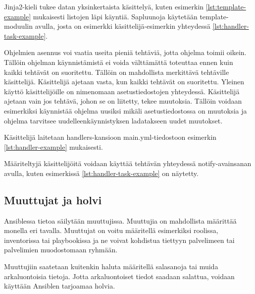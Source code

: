 

Jinja2-kieli tukee datan yksinkertaista käsittelyä, kuten esimerkin
\ref{lst:template-example} mukaisesti listojen läpi käyntiä. Sapluunoja
käytetään template-moduulin avulla, josta on esimerkki käsittelijä-esimerkin
yhteydessä \ref{lst:handler-task-example}. \parencite{AnsibleDocs}

Ohjelmien asennus voi vaatia useita pieniä tehtäviä, jotta ohjelma toimii
oikein. Tällöin ohjelman käynnistämistä ei voida välttämättä toteuttaa ennen
kuin kaikki tehtävät on suoritettu. Tällöin on mahdollista merkittävä tehtäville
käsittelijä. Käsittelijä ajetaan vasta, kun kaikki tehtävät on suoritettu.
Yleinen käyttö käsittelijöille  on nimenomaan asetustiedostojen yhteydessä.
Käsittelijä ajetaan vain jos tehtävä, johon se on liitetty, tekee muutoksia.
Tällöin voidaan esimerkiksi käynnistää ohjelma uusiksi mikäli asetustiedostossa
on muutoksia ja ohjelma tarvitsee uudelleenkäynnistyksen ladatakseen uudet
muutokset. \parencite{JamesFreeman2020PA2}

Käsittelijä laitetaan handlers-kansioon main.yml-tiedostoon esimerkin
\ref{lst:handler-example} mukaisesti.



Määriteltyjä käsittelijöitä voidaan käyttää tehtävän yhteydessä notify-avainsanan
avulla, kuten esimerkissä \ref{lst:handler-task-example} on näytetty.



\subsection{Muuttujat ja holvi}

Ansiblessa tietoa säilytään muuttujissa. Muuttujia on mahdollista määrittää monella
eri tavalla. Muuttujat on voitu määritellä esimerkiksi roolissa, inventorissa
tai playbookissa ja ne voivat kohdistua tiettyyn palvelimeen tai palvelimien
muodostomaan ryhmään. \parencite{JamesFreeman2020PA2}

Muuttujiin saatetaan kuitenkin haluta määritellä salasanoja tai muida arkaluontoisia
tietoja. Jotta arkaluontoiset tiedot saadaan salattua, voidaan käyttään Ansiblen
tarjoamaa holvia. \parencite{JamesFreeman2020PA2}

